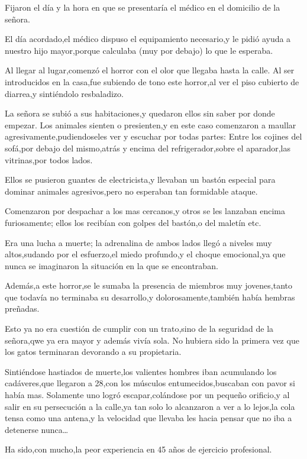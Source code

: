 \documentclass[letterpaper,12pt]{book}
\begin{document}
Fijaron el día y la hora en que se presentaría el médico en el domicilio de la señora.

El día acordado,el médico dispuso el equipamiento necesario,y le pidió ayuda a nuestro hijo mayor,porque calculaba (muy por debajo) lo que le esperaba. 

Al llegar al lugar,comenzó el horror con el olor que llegaba hasta la calle. Al ser introducidos en la casa,fue subiendo de tono este horror,al ver el piso cubierto de diarrea,y sintiéndolo resbaladizo.

La señora se subió a sus habitaciones,y quedaron ellos sin saber por donde empezar. Los animales sienten o presienten,y en este caso comenzaron a maullar agresivamente,pudiendoseles ver y escuchar por todas partes: Entre los cojines del sofá,por debajo del mismo,atrás y encima del refrigerador,sobre el aparador,las vitrinas,por todos lados. 

Ellos se pusieron guantes de electricista,y llevaban un bastón especial para dominar animales agresivos,pero no esperaban tan formidable ataque.

Comenzaron por despachar a los mas cercanos,y otros se les lanzaban encima furiosamente; ellos los recibían con golpes del bastón,o del maletín etc.

Era una lucha a muerte; la adrenalina de ambos lados llegó a niveles muy altos,sudando por el esfuerzo,el miedo profundo,y el choque emocional,ya que nunca se imaginaron la situación en la que se encontraban.

Además,a este horror,se le sumaba la presencia de miembros muy jovenes,tanto que todavía no terminaba su desarrollo,y dolorosamente,también había hembras preñadas.

Esto ya no era cuestión de cumplir con un trato,sino de la seguridad de la señora,qwe ya era mayor y además vivía sola. No hubiera sido la primera vez que los gatos terminaran devorando a su propietaria.

Sintiéndose hastiados de muerte,los valientes hombres iban acumulando los cadáveres,que llegaron a 28,con los músculos entumecidos,buscaban con pavor si había mas. Solamente uno logró escapar,colándose por un pequeño orificio,y al salir en su persecución a la calle,ya tan solo lo alcanzaron a ver a lo lejos,la cola tensa como una antena,y la velocidad que llevaba les hacia pensar que no iba a detenerse nunca\ldots

Ha sido,con mucho,la peor experiencia en 45 años de ejercicio profesional.
\end{document}
